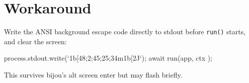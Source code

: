 \section{Workaround}\label{record-366-workaround}

Write the ANSI background escape code directly to stdout before \texttt{r\allowbreak{}u\allowbreak{}n\allowbreak{}(\allowbreak{})} starts, and clear the screen:

\begin{CodeBlock}
process.stdout.write(`\x1b[48;2;45;25;34m\x1b[2J`);
await run(app, { ctx });
\end{CodeBlock}

This survives bijou's alt screen enter but may flash briefly.

